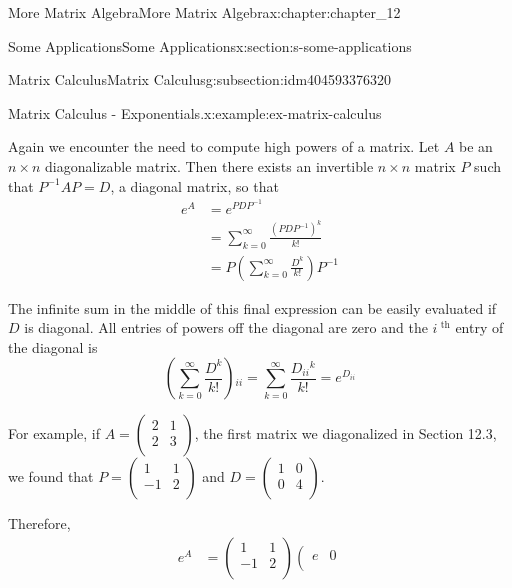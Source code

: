 \documentclass[twoside,10pt,]{book}
\numberwithin{equation}{section}
\begin{document}
\begin{chapterptx}{More Matrix Algebra}{}{More Matrix Algebra}{}{}{x:chapter:chapter_12}
\begin{sectionptx}{Some Applications}{}{Some Applications}{}{}{x:section:s-some-applications}
\begin{subsectionptx}{Matrix Calculus}{}{Matrix Calculus}{}{}{g:subsection:idm404593376320}
\begin{example}{Matrix Calculus - Exponentials.}{x:example:ex-matrix-calculus}
\begin{equation*}
\end{equation*}
%
\par
Again we encounter the need to compute high powers of a matrix.  Let \(A\) be an \(n\times n\) diagonalizable matrix. Then there exists an invertible \(n\times n\) matrix \(P\) such that \(P^{-1}A P = D\), a diagonal matrix, so that%
\begin{equation*}
\begin{split}
e^A &=e^{P D P^{-1} }\\
& =\sum _{k=0}^{\infty } \frac{\left(P D P^{-1}\right)^k}{k!} \\
& = P \left(\sum _{k=0}^{\infty } \frac{ D^k}{k!}\right)P^{-1}
\end{split}
\end{equation*}
%
\par
The infinite sum in the middle of this final expression can be easily evaluated if \(D\) is diagonal.  All entries of powers off the diagonal are zero and the \(i^{\textrm{ th}}\) entry of the diagonal is%
\begin{equation*}
\left(\sum _{k=0}^{\infty } \frac{ D^k}{k!}\right){}_{i i}=\sum _{k=0}^{\infty } \frac{ D_{i i}{}^k}{k!}= e^{D_{ii}}
\end{equation*}
%
\par
For example, if \(A=\left(
\begin{array}{cc}
2 & 1 \\
2 & 3 \\
\end{array}
\right)\), the first matrix we diagonalized in Section 12.3, we found that \(P =\left(
\begin{array}{cc}
1 & 1 \\
-1 & 2 \\
\end{array}
\right)\) and \(D= \left(
\begin{array}{cc}
1 & 0 \\
0 & 4 \\
\end{array}
\right)\).%
\par
Therefore,%
\begin{equation*}
\begin{split}
e^A &=\left(
\begin{array}{cc}
1 & 1 \\
-1 & 2 \\
\end{array}
\right) \left(
\begin{array}{cc}
e & 0 \\

\end{array}
\end{split}
\end{equation*}
\end{example}
\end{subsectionptx}
\end{sectionptx}
\end{chapterptx}
\end{document}
